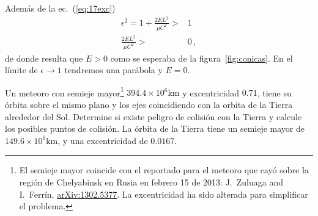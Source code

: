 Además de la ec.~(\ref{eq:17exc})
\begin{align}
  \epsilon^2=1+\frac{2EL^2}{\mu C^2}>&1\nonumber\\
  \frac{2EL^2}{\mu C^2}>&0\,,
\end{align}
de donde resulta que $E>0$ como se esperaba de la figura~\ref{fig:conicas}. En el límite de $\epsilon\to 1$ tendremos una parábola y $E=0$.

\ejemplo{}
\begin{frame}
Un meteoro con semieje mayor\footnote{El semieje mayor coincide con el reportado para el meteoro que cayó sobre la región de Chelyabinsk en Rusia en febrero 15 de 2013: J.~Zuluaga and I.~Ferrín, \href{http://arxiv.org/abs/1302.5377}{arXiv:1302.5377}. La excentricidad ha sido alterada para simplificar el problema.} ${394.4\times10^{6}}\si{\kilo\meter}$ y  excentricidad $0.71$, tiene su órbita sobre el mismo plano y los ejes coincidiendo con la orbita de la Tierra alrededor del Sol. Determine si existe peligro de colisión con la Tierra y calcule  los posibles puntos de colisión. La órbita de la Tierra tiene un semieje mayor de ${149.6\times10^{6}}\si{\kilo\meter}$,  y una excentricidad de $0.0167$.
\end{frame}

